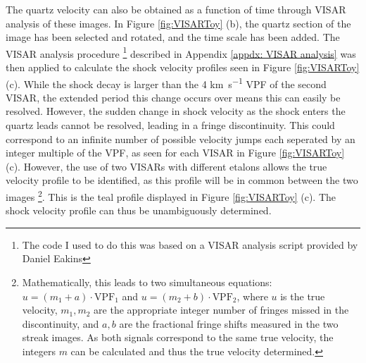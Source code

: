 The quartz velocity can also be obtained as a function of time through VISAR analysis of these images. In Figure \ref{fig:VISARToy} (b), the quartz section of the image has been selected and rotated, and the time scale has been added. The VISAR analysis procedure \footnote{The code I used to do this was based on a VISAR analysis script provided by Daniel Eakins} described in Appendix \ref{appdx: VISAR analysis} was then applied to calculate the shock velocity profiles seen in Figure \ref{fig:VISARToy} (c). While the shock decay is larger than the 4 \unit{\kilo\meter\per\second} VPF of the second VISAR, the extended period this change occurs over means this can easily be resolved. However, the sudden change in shock velocity as the shock enters the quartz leads cannot be resolved, leading in a fringe discontinuity. This could correspond to an infinite number of possible velocity jumps each seperated by an integer multiple of the VPF, as seen for each VISAR in Figure \ref{fig:VISARToy} (c). However, the use of two VISARs with different etalons allows the true velocity profile to be identified, as this profile will be in common between the two images \footnote{Mathematically, this leads to two simultaneous equations: $u = (m_1 + a) \cdot \textrm{VPF}_1$ and $u = (m_2 + b) \cdot \textrm{VPF}_2$, where $u$ is the true velocity, $m_1, m_2$ are the appropriate integer number of fringes missed in the discontinuity, and $a,b$ are the fractional fringe shifts measured in the two streak images. As both signals correspond to the same true velocity, the integers $m$ can be calculated and thus the true velocity determined.}. This is the teal profile displayed in Figure \ref{fig:VISARToy} (c). The shock velocity profile can thus be unambiguously determined.





